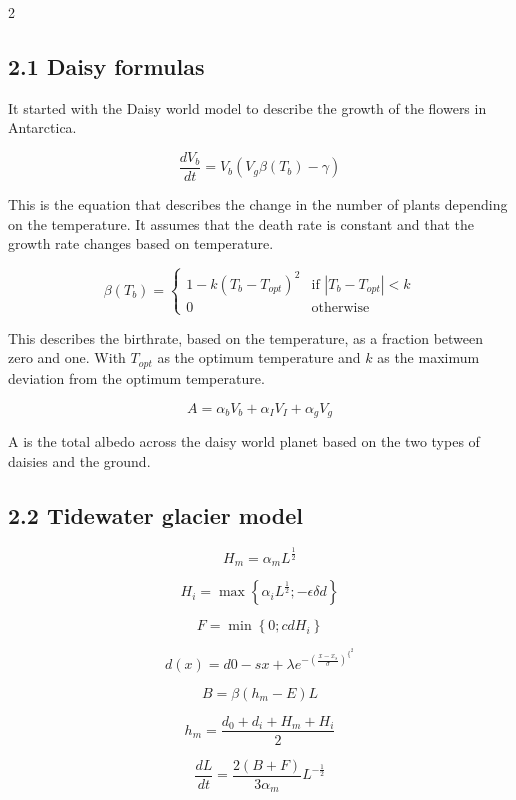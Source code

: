 \documentclass[
]{article}
\begin{document}
\begin{multicols}{2}
\subsection{2.1 Daisy formulas} %

It started with the Daisy world model to describe the growth of the flowers in Antarctica.

\[\frac{dV_{b}}{dt} = V_{b}\left( V_{g}\beta\left( T_{b} \right) - \gamma \right)\] %

This is the equation that describes the change in the number of plants depending on the temperature. It assumes that the death rate is constant and that the growth rate changes based on temperature.

\[\beta\left( T_{b} \right) = \begin{cases} 1 - k\left( T_{b} - T_{opt} \right)^{2} & \text{if } \left| T_{b} - T_{opt} \right| < k \\ 0 & \text{otherwise} \end{cases}\] %

This describes the birthrate, based on the temperature, as a fraction between zero and one. With $T_{opt}$ as the optimum temperature and $k$ as the maximum deviation from the optimum temperature. 

\[A = \alpha_{b}V_{b} + \alpha_{I}V_{I} + \alpha_{g}V_{g}\] %

A is the total albedo across the daisy world planet based on the two types of daisies and the ground.

\subsection{2.2 Tidewater glacier model} %

\[H_{m} = \alpha_{m}L^{\frac{1}{2}}\] 

\[H_{i} = \max\left\{ \alpha_{i}L^{\frac{1}{2}}; - \epsilon\delta d \right\}\]

\[F = \min\left\{ 0;cdH_{i} \right\}\]

\[d(x) = d0 - sx + \lambda e^{- \left( \frac{x - x_{s}}{\sigma} \right)^{\{^{2}}}\]

\[B = \beta\left( h_{m} - E \right)L\]

\[h_{m} = \frac{d_{0} + d_{i} + H_{m} + H_{i}}{2}\]

\[\frac{dL}{dt} = \frac{2(B + F)}{3\alpha_{m}}L^{- \frac{1}{2}}\]


\end{multicols}
\end{document}
